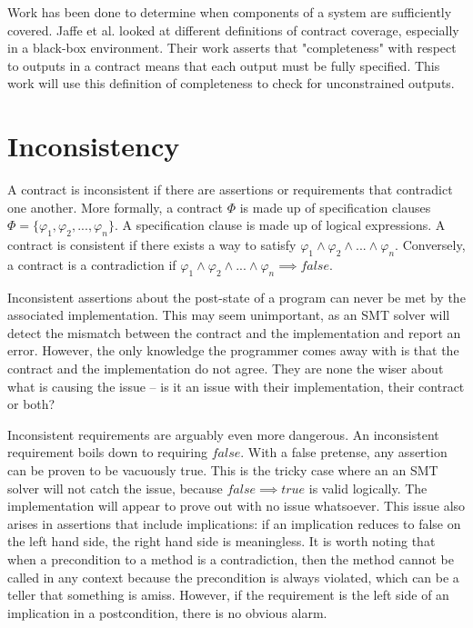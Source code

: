\documentclass{article}
\newif\ifcomments
\newcommand{\egm}[1]{\ifcomments\textcolor{orange}{egm: #1}\fi}
\begin{document}
Work has been done to determine when components of a system are sufficiently covered. Jaffe et al. \cite{jaffe1989completeness}
looked at different definitions of contract coverage, especially in a black-box environment. Their work asserts that "completeness"
with respect to outputs in a contract means that each output must be fully specified. This work will use this definition of
completeness to check for unconstrained outputs.

\section{Inconsistency}

A contract is inconsistent if there are assertions or requirements that contradict one another. More formally, a
contract \(\Phi\) is made up of specification clauses \(\Phi = \{\varphi_{1}, \varphi_{2}, ..., \varphi_{n}\}\).
A specification clause is made up of logical expressions. A contract is consistent if there exists a way to satisfy
\(\varphi_{1} \land \varphi_{2} \land ... \land \varphi_{n} \). Conversely, a contract is a contradiction
if \(\varphi_{1} \land \varphi_{2} \land ... \land \varphi_{n} \implies false\).

Inconsistent assertions about the post-state of a program can never be met by the associated implementation.
This may seem unimportant, as an SMT solver will detect the mismatch between the contract and the implementation
and report an error. However, the only knowledge the programmer comes away with is that the contract and the
implementation do not agree. They are none the wiser about what is causing the issue – is it an issue
with their implementation, their contract or both?
\egm{Didn't we show that Dafny can prove anything about the post-state of a method in the presesnce of a post-condition that is a contradiction?}

Inconsistent requirements are arguably even more dangerous. An inconsistent requirement boils down to requiring
 \(false\). With a false pretense, any assertion can be proven to be vacuously true. This is the tricky case
 where an an SMT solver will not catch the issue, because \(false \implies true\) is valid logically. The implementation
 will appear to prove out with no issue whatsoever. This issue also arises in assertions that include implications: if
 an implication reduces to false on the left hand side, the right hand side is meaningless. It is worth noting that when 
 a precondition to a method is a contradiction, then the method cannot be called in any context because the precondition is 
 always violated, which can be a teller that something is amiss. However, if the requirement is the left side of an 
 implication in a postcondition, there is no obvious alarm.
\end{document}
